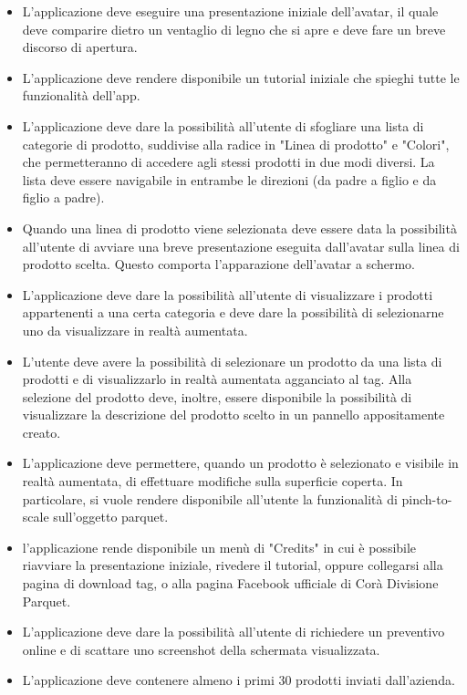 \begin{itemize}
	
	\item L'applicazione deve eseguire una presentazione iniziale dell'avatar, il quale deve comparire dietro un ventaglio di legno che si apre e deve fare un breve discorso di apertura.
	
	\item L'applicazione deve rendere disponibile un tutorial iniziale che spieghi tutte le funzionalit\`a dell'app.
	
	\item L'applicazione deve dare la possibilit\`a all'utente di sfogliare una lista di categorie di prodotto, suddivise alla radice in  "Linea di prodotto" e "Colori", che permetteranno di accedere agli stessi prodotti in due modi diversi. La lista deve essere navigabile in entrambe le direzioni (da padre a figlio e da figlio a padre).
	
	\item Quando una linea di prodotto viene selezionata deve essere data la possibilit\`a all'utente di avviare una breve presentazione eseguita dall'avatar sulla linea di prodotto scelta. Questo comporta l'apparazione dell'avatar a schermo.
	
	\item L'applicazione deve dare la possibilit\`a all'utente di visualizzare i prodotti appartenenti a una certa categoria e deve dare la possibilit\`a di selezionarne uno da visualizzare in realt\`a aumentata.
	
	\item L'utente deve avere la possibilit\`a di selezionare un prodotto da una lista di prodotti e di visualizzarlo in realt\`a aumentata agganciato al tag. Alla selezione del prodotto deve, inoltre, essere disponibile la possibilit\`a di visualizzare la descrizione del prodotto scelto in un pannello appositamente creato.
	
	\item L'applicazione deve permettere, quando un prodotto \`e selezionato e visibile in realt\`a aumentata, di effettuare modifiche sulla superficie coperta. In particolare, si vuole rendere disponibile all'utente la funzionalit\`a di pinch-to-scale sull'oggetto parquet.
	
	\item l'applicazione rende disponibile un men\`u di "Credits" in cui \`e possibile riavviare la presentazione iniziale, rivedere il tutorial, oppure collegarsi alla pagina di download tag, o alla pagina Facebook ufficiale di Cor\`a Divisione Parquet.
	
	\item L'applicazione deve dare la possibilit\`a all'utente di richiedere un preventivo online e di scattare uno screenshot della schermata visualizzata.
	
	\item L'applicazione deve contenere almeno i primi 30 prodotti inviati dall'azienda. 
	
\end{itemize}

